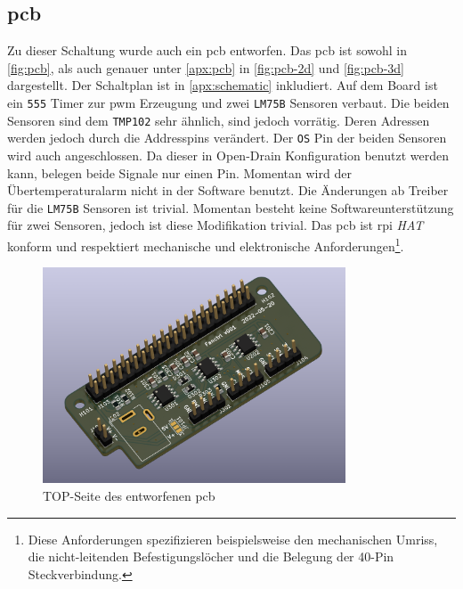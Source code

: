 \subsection{\acrshort{pcb}}

Zu dieser Schaltung wurde auch ein \gls{pcb} entworfen.
Das \gls{pcb} ist sowohl in \autoref{fig:pcb}, als auch genauer unter \autoref{apx:pcb} in \autoref{fig:pcb-2d} und \autoref{fig:pcb-3d} dargestellt.
Der Schaltplan ist in \autoref{apx:schematic} inkludiert.
Auf dem Board ist ein \texttt{555} Timer zur \gls{pwm} Erzeugung und zwei \texttt{LM75B} Sensoren verbaut.
Die beiden Sensoren sind dem \texttt{TMP102} sehr ähnlich, sind jedoch vorrätig.
Deren Adressen werden jedoch durch die Addresspins verändert.
Der \texttt{OS} Pin der beiden Sensoren wird auch angeschlossen.
Da dieser in Open-Drain Konfiguration benutzt werden kann, belegen beide Signale nur einen Pin.
Momentan wird der Übertemperaturalarm nicht in der Software benutzt.
Die Änderungen ab Treiber für die \texttt{LM75B} Sensoren ist trivial.
Momentan besteht keine Softwareunterstützung für zwei Sensoren, jedoch ist diese Modifikation trivial.
Das \gls{pcb} ist \gls{rpi} \textit{HAT} konform und respektiert mechanische und elektronische Anforderungen\footnote{Diese Anforderungen spezifizieren beispielsweise den mechanischen Umriss, die nicht-leitenden Befestigungslöcher und die Belegung der 40-Pin Steckverbindung.}.

\begin{figure}[h]
    \centering
    \includegraphics[width=9cm]{./img/pcb-3d-top.png}
    \caption{TOP-Seite des entworfenen \gls{pcb}}
    \label{fig:pcb}
\end{figure}
